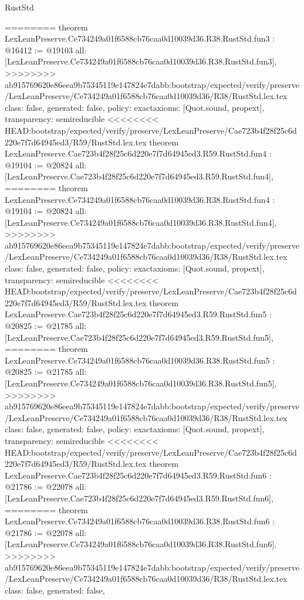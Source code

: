 \begin{lexlean}{RustStd}
\begin{coremodule}
{\begin{coremodule}
{{{{{{========
theorem LexLeanPreserve.Ce734249a01f6588cb76caa0d10039d36.R38.RustStd.fun3 : @16412 := @19103 {
  all: [LexLeanPreserve.Ce734249a01f6588cb76caa0d10039d36.R38.RustStd.fun3],
>>>>>>>> ab915769620e86eea9b75345119e147824e7dabb:bootstrap/expected/verify/preserve/LexLeanPreserve/Ce734249a01f6588cb76caa0d10039d36/R38/RustStd.lex.tex
  class: false,
  generated: false,
  policy: exact{axioms: [Quot.sound, propext]},
  transparency: semireducible
}
<<<<<<<< HEAD:bootstrap/expected/verify/preserve/LexLeanPreserve/Cae723b4f28f25c6d220e7f7d64945ed3/R59/RustStd.lex.tex
theorem LexLeanPreserve.Cae723b4f28f25c6d220e7f7d64945ed3.R59.RustStd.fun4 : @19104 := @20824 {
  all: [LexLeanPreserve.Cae723b4f28f25c6d220e7f7d64945ed3.R59.RustStd.fun4],
========
theorem LexLeanPreserve.Ce734249a01f6588cb76caa0d10039d36.R38.RustStd.fun4 : @19104 := @20824 {
  all: [LexLeanPreserve.Ce734249a01f6588cb76caa0d10039d36.R38.RustStd.fun4],
>>>>>>>> ab915769620e86eea9b75345119e147824e7dabb:bootstrap/expected/verify/preserve/LexLeanPreserve/Ce734249a01f6588cb76caa0d10039d36/R38/RustStd.lex.tex
  class: false,
  generated: false,
  policy: exact{axioms: [Quot.sound, propext]},
  transparency: semireducible
}
<<<<<<<< HEAD:bootstrap/expected/verify/preserve/LexLeanPreserve/Cae723b4f28f25c6d220e7f7d64945ed3/R59/RustStd.lex.tex
theorem LexLeanPreserve.Cae723b4f28f25c6d220e7f7d64945ed3.R59.RustStd.fun5 : @20825 := @21785 {
  all: [LexLeanPreserve.Cae723b4f28f25c6d220e7f7d64945ed3.R59.RustStd.fun5],
========
theorem LexLeanPreserve.Ce734249a01f6588cb76caa0d10039d36.R38.RustStd.fun5 : @20825 := @21785 {
  all: [LexLeanPreserve.Ce734249a01f6588cb76caa0d10039d36.R38.RustStd.fun5],
>>>>>>>> ab915769620e86eea9b75345119e147824e7dabb:bootstrap/expected/verify/preserve/LexLeanPreserve/Ce734249a01f6588cb76caa0d10039d36/R38/RustStd.lex.tex
  class: false,
  generated: false,
  policy: exact{axioms: [Quot.sound, propext]},
  transparency: semireducible
}
<<<<<<<< HEAD:bootstrap/expected/verify/preserve/LexLeanPreserve/Cae723b4f28f25c6d220e7f7d64945ed3/R59/RustStd.lex.tex
theorem LexLeanPreserve.Cae723b4f28f25c6d220e7f7d64945ed3.R59.RustStd.fun6 : @21786 := @22078 {
  all: [LexLeanPreserve.Cae723b4f28f25c6d220e7f7d64945ed3.R59.RustStd.fun6],
========
theorem LexLeanPreserve.Ce734249a01f6588cb76caa0d10039d36.R38.RustStd.fun6 : @21786 := @22078 {
  all: [LexLeanPreserve.Ce734249a01f6588cb76caa0d10039d36.R38.RustStd.fun6],
>>>>>>>> ab915769620e86eea9b75345119e147824e7dabb:bootstrap/expected/verify/preserve/LexLeanPreserve/Ce734249a01f6588cb76caa0d10039d36/R38/RustStd.lex.tex
  class: false,
  generated: false,
}}}}}}}}}}
\end{coremodule}}
\end{coremodule}
\end{lexlean}
